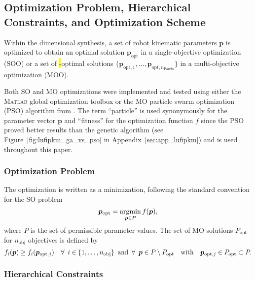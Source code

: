 %

\subsection{Optimization Problem, Hierarchical Constraints, and Optimization Scheme}
\label{sec:ds_optscheme}

%
Within the dimensional synthesis, a set of robot kinematic parameters $\bm{p}$ is optimized to obtain an optimal solution $\bm{p}_{\mathrm{opt}}$ in a single-objective optimization (SOO) or a set of \hl{-}optimal solutions %
$\{\bm{p}_{\mathrm{opt},1},\dots,\bm{p}_{\mathrm{opt},n_\mathrm{Pareto}}\}$ in a multi-objective optimization (MOO).

Both SO and MO optimizations were implemented and tested using either the \textsc{Matlab} global optimization toolbox \cite{MatlabGOT} or the MO particle swarm optimization (PSO) algorithm from \cite{Martinez2019}.
The term ``particle'' is used synonymously for the parameter vector $\bm{p}$ and ``fitness'' for the optimization function $f$ since the PSO proved {better results than the genetic algorithm (see Figure~\ref{fig:lufipkm_ga_vs_pso} in Appendix~\ref{sec:app_lufipkm})} and is used throughout this paper.

\subsubsection{{Optimization Problem}}

The optimization is written as a minimization, following the standard convention for the SO problem
\begin{equation}
\bm{p}_{\mathrm{opt}} = \operatorname*{argmin}_{\bm{p} \in P} f(\bm{p}),
\end{equation}
where $P$ is the set of permissible parameter values.
The set of MO solutions $P_{\mathrm{opt}}$ for $n_\mathrm{obj}$ objectives is defined by
\begin{equation} 
%
f_i (\bm{p}) \geq f_i(\bm{p}_{\mathrm{opt},j})
\quad \forall \enskip i \in \{1,\dots,n_\mathrm{obj}\}
\enskip \text{and}\enskip 
\forall \enskip \bm{p} \in P \setminus P_{\mathrm{opt}} 
\quad \text{with} \quad
\bm{p}_{\mathrm{opt},j} \in P_{\mathrm{opt}} \subset P.
%
\end{equation}



\subsubsection{{Hierarchical Constraints}}

